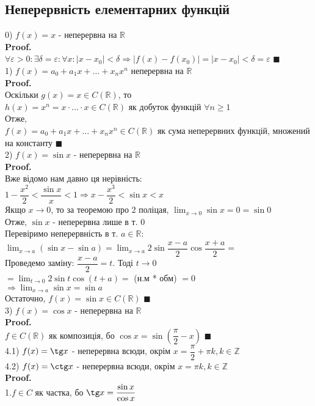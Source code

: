 \documentclass[a4paper, 14pt]{extarticle}
\def\huge{\displaystyle}
\def\bigline{\vspace{5mm}\\}
\theoremstyle{theoremdd}
\theoremstyle{theoremdd}
\theoremstyle{theoremdd}
\theoremstyle{theoremdd}
\theoremstyle{theoremdd}
\theoremstyle{theoremdd}
\theoremstyle{theoremdd}
\theoremstyle{theoremdd}
\def\proof{\textbf{Proof.}\\}
\def\qed{$\blacksquare$}
\begin{document}
\subsection{Неперервність елементарних функцій}
0) $f(x) = x$ - неперервна на $\mathbb{R}$\\
\proof
$\forall \varepsilon > 0: \exists \delta = \varepsilon: \forall x: |x-x_0|<\delta \Rightarrow |f(x)-f(x_0)| = |x-x_0|<\delta = \varepsilon$ \qed
\bigline
1) $f(x) = a_0 + a_1 x + \dots + x_n x^n$ неперервна на $\mathbb{R}$\\
\proof
Оскільки $g(x) = x \in C(\mathbb{R})$, то \\ $h(x)=x^n = x \cdot \dots \cdot x \in C(\mathbb{R})$ як добуток функцій $\forall n \geq 1$\\
Отже,\\
$f(x) = a_0 + a_1 x + \dots + x_n x^n \in C(\mathbb{R})$ як сума неперервних функцій, множений на константу \qed
\bigline
2) $f(x) = \sin x$ - неперервна на $\mathbb{R}$\\
\proof
Вже відомо нам давно ця нерівність:\\
$1 - \dfrac{x^2}{2} < \dfrac{\sin x}{x} < 1 \Rightarrow x - \dfrac{x^3}{2} < \sin x < x$\\
Якщо $x \to 0$, то за теоремою про 2 поліцая, $\huge \lim_{x \to 0} \sin x = 0 = \sin 0$\\
Отже, $\sin x$ - неперервна лише в т. $0$\\
Перевіримо неперервність в т. $a \in \mathbb{R}$:\\
$\huge \lim_{x \to a} (\sin x - \sin a) = \lim_{x \to a} 2 \sin \dfrac{x-a}{2} \cos \dfrac{x+a}{2} = $\\
Проведемо заміну: $\dfrac{x-a}{2} = t$. Тоді $t \to 0$\\
$= \huge \lim_{t \to 0} 2 \sin t \cos (t+a) =$ (н.м * обм) $= 0$\\
$\Rightarrow \huge \lim_{x \to a} \sin x = \sin a$\\
Остаточно, $f(x) = \sin x \in C(\mathbb{R})$ \qed
\bigline
3) $f(x) = \cos x$ - неперервна на $\mathbb{R}$\\
\proof
$f \in C(\mathbb{R})$ як композиція, бо $\cos x = \sin\left(\dfrac{\pi}{2} -x \right)$ \qed
\bigline
4.1) $f(x) = \tg x$ - неперервна всюди, окрім $x = \dfrac{\pi}{2} + \pi k, k \in \mathbb{Z}$\\
4.2) $f(x) = \ctg x$ - неперервна всюди, окрім $x = \pi k, k \in \mathbb{Z}$\\
\proof
1.$f \in C$ як частка, бо $\tg x = \dfrac{\sin x}{\cos x}$\\
\end{document}
